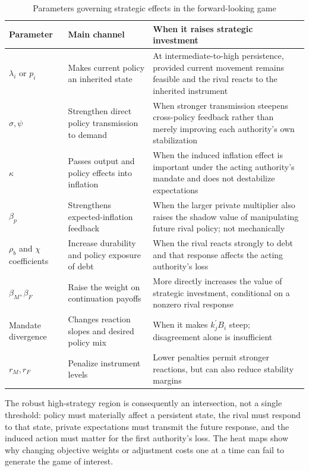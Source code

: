 \documentclass[11pt]{article}
\newcommand{\trans}{^{\prime}}
\begin{document}
\begin{table}[H]
\centering
\caption{Parameters governing strategic effects in the forward-looking game}
\label{tab:parameterlogic}
\begin{tabular}{@{}>{\raggedright\arraybackslash}p{}
                    >{\raggedright\arraybackslash}p{}
                    >{\raggedright\arraybackslash}p{}@{}}
\toprule
Parameter & Main channel & When it raises strategic investment \\
\midrule
$\lambda_i$ or $p_i$ & Makes current policy an inherited state & At intermediate-to-high persistence, provided current movement remains feasible and the rival reacts to the inherited instrument \\
$\sigma,\psi$ & Strengthen direct policy transmission to demand & When stronger transmission steepens cross-policy feedback rather than merely improving each authority's own stabilization \\
$\kappa$ & Passes output and policy effects into inflation & When the induced inflation effect is important under the acting authority's mandate and does not destabilize expectations \\
$\beta_p$ & Strengthens expected-inflation feedback & When the larger private multiplier also raises the shadow value of manipulating future rival policy; not mechanically \\
$\rho_b$ and $\chi$ coefficients & Increase durability and policy exposure of debt & When the rival reacts strongly to debt and that response affects the acting authority's loss \\
$\beta_M,\beta_F$ & Raise the weight on continuation payoffs & More directly increases the value of strategic investment, conditional on a nonzero rival response \\
Mandate divergence & Changes reaction slopes and desired policy mix & When it makes $k_j\trans B_i$ steep; disagreement alone is insufficient \\
$r_M,r_F$ & Penalize instrument levels & Lower penalties permit stronger reactions, but can also reduce stability margins \\
\bottomrule
\end{tabular}
\end{table}

The robust high-strategy region is consequently an intersection, not a single
threshold: policy must materially affect a persistent state, the rival must
respond to that state, private expectations must transmit the future response,
and the induced action must matter for the first authority's loss. The heat
maps show why changing objective weights or adjustment costs one at a time can
fail to generate the game of interest.
\end{document}
